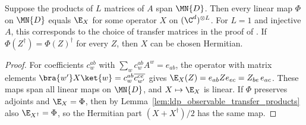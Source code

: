 \begin{lemma}
    \label{lem:ldp_observable_transfer_surjective}
    \leanok
    Suppose the products of $L$ matrices of $A$ span $\MN{D}$. Then every
    linear map $\Phi$ on $\MN{D}$ equals $\E_X$ for some operator $X$ on
    $(\C^d)^{\otimes L}$. For $L=1$ and injective $A$, this corresponds to the
    choice of transfer matrices in the proof of
    \cite[Lemma~2]{Malz2024Preparation}. If
    $\Phi(Z^\dagger)=\Phi(Z)^\dagger$ for every $Z$, then $X$ can be chosen
    Hermitian.
\end{lemma}
\begin{proof}
    \leanok
    For coefficients $c^{ab}_w$ with $\sum_wc^{ab}_wA^w=e_{ab}$, the operator
    with matrix elements $\bra{w'}X\ket{w}=c^{ab}_w\overline{c^{ce}_{w'}}$ gives
    $\E_X(Z)=e_{ab}Ze_{ec}=Z_{be}\,e_{ac}$. These maps span all linear maps on
    $\MN{D}$, and $X\mapsto\E_X$ is linear. If $\Phi$ preserves adjoints and
    $\E_X=\Phi$, then by
    Lemma~\ref{lem:ldp_observable_transfer_products} also
    $\E_{X^\dagger}=\Phi$, so the Hermitian part $(X+X^\dagger)/2$ has the
    same map.
\end{proof}


